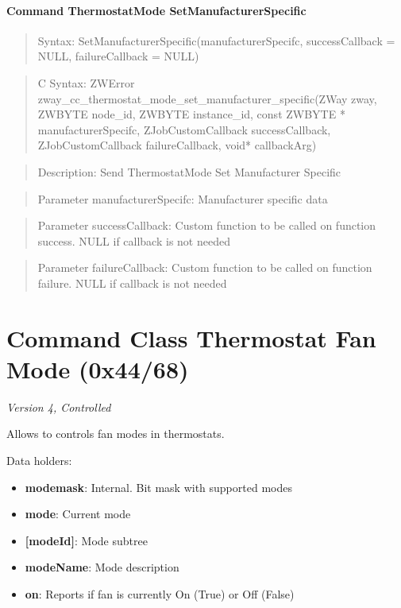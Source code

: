 \paragraph{Command ThermostatMode SetManufacturerSpecific}
\begin{quote}Syntax: SetManufacturerSpecific(manufacturerSpecifc, successCallback = NULL, failureCallback = NULL)\end{quote}
\begin{quote}C Syntax: ZWError zway\_cc\_thermostat\_mode\_set\_manufacturer\_specific(ZWay zway, ZWBYTE node\_id, ZWBYTE instance\_id, const ZWBYTE * manufacturerSpecifc, ZJobCustomCallback successCallback, ZJobCustomCallback failureCallback, void* callbackArg)\end{quote}
\begin{quote}Description: Send ThermostatMode Set Manufacturer Specific\end{quote}
\begin{quote}Parameter manufacturerSpecifc: Manufacturer specific data\end{quote}
\begin{quote}Parameter successCallback: Custom function to be called on function success. NULL if callback is not needed\end{quote}
\begin{quote}Parameter failureCallback: Custom function to be called on function failure. NULL if callback is not needed\end{quote}



\section{Command Class Thermostat Fan Mode (0x44/68)}

\textit{Version 4, Controlled}
\newline

Allows to controls fan modes in thermostats.
\newline

\noindent
Data holders:

\begin{itemize}
\item \textbf{modemask}: Internal. Bit mask with supported modes
\item \textbf{mode}: Current mode
\item \textbf{[modeId]}: Mode subtree
\item \qquad\textbf{modeName}: Mode description
\item \textbf{on}: Reports if fan is currently On (True) or Off (False)
\end{itemize}

